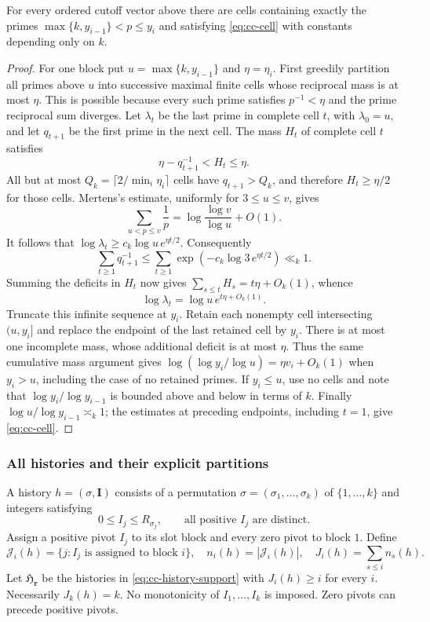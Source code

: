 \begin{lemma}\label{lem:cc-cell-supply}
For every ordered cutoff vector above there are cells containing
exactly the primes $\max\{k,y_{i-1}\}<p\le y_i$ and satisfying
\eqref{eq:cc-cell} with constants depending only on $k$.
\end{lemma}
\begin{proof}
For one block put $u=\max\{k,y_{i-1}\}$ and $\eta=\eta_i$.
First greedily partition all primes above $u$ into successive maximal
finite cells whose reciprocal mass is at most $\eta$. This is
possible because every such prime satisfies $p^{-1}<\eta$ and the
prime reciprocal sum diverges. Let $\lambda_t$ be the last prime
in complete cell $t$, with $\lambda_0=u$, and let $q_{t+1}$ be the
first prime in the next cell. The mass $H_t$ of complete cell $t$
satisfies
\[
       \eta-q_{t+1}^{-1}<H_t\le\eta.
\]
All but at most $Q_k=\lceil2/\min_i\eta_i\rceil$ cells have
$q_{t+1}>Q_k$, and therefore $H_t\ge\eta/2$ for those cells.
Mertens's estimate, uniformly for $3\le u\le v$, gives
\[
 \sum_{u<p\le v}\frac1p
       =\log\frac{\log v}{\log u}+O(1).
\]
It follows that
$\log\lambda_t\ge c_k\log u\,e^{\eta t/2}$.
Consequently
\[
 \sum_{t\ge1}q_{t+1}^{-1}
 \le\sum_{t\ge1}\exp(-c_k\log3\,e^{\eta t/2})\ll_k1.
\]
Summing the deficits in $H_t$ now gives
$\sum_{s\le t}H_s=t\eta+O_k(1)$, whence
\[
           \log\lambda_t=\log u\,e^{t\eta+O_k(1)}.
\]
Truncate this infinite sequence at $y_i$. Retain each nonempty
cell intersecting $(u,y_i]$ and replace the endpoint of the last
retained cell by $y_i$. There is at most one incomplete mass,
whose additional deficit is at most $\eta$. Thus the same cumulative
mass argument gives $\log(\log y_i/\log u)=\eta v_i+O_k(1)$
when $y_i>u$, including the case of no retained primes.
If $y_i\le u$, use no cells and note that
$\log y_i/\log y_{i-1}$ is bounded above and below in terms of $k$.
Finally $\log u/\log y_{i-1}\asymp_k1$; the estimates at preceding
endpoints, including $t=1$, give \eqref{eq:cc-cell}.
\end{proof}

\subsubsection{All histories and their explicit partitions}
A history $h=(\sigma,\mathbf I)$ consists of a permutation
$\sigma=(\sigma_1,\ldots,\sigma_k)$ of $\{1,\ldots,k\}$ and
integers satisfying
\begin{equation}\label{eq:cc-history-support}
       0\le I_j\le R_{\sigma_j},\qquad
       \text{all positive }I_j\text{ are distinct}.
\end{equation}
Assign a positive pivot $I_j$ to its slot block and every zero pivot
to block $1$. Define
\[
 \mathcal J_i(h)=\{j:I_j\text{ is assigned to block }i\},\quad
 n_i(h)=|\mathcal J_i(h)|,\quad J_i(h)=\sum_{s\le i}n_s(h).
\]
Let $\mathfrak H_{\mathbf r}$ be the histories in
\eqref{eq:cc-history-support} with $J_i(h)\ge i$ for every $i$.
Necessarily $J_k(h)=k$. No monotonicity of $I_1,\ldots,I_k$ is
imposed. Zero pivots can precede positive pivots.

